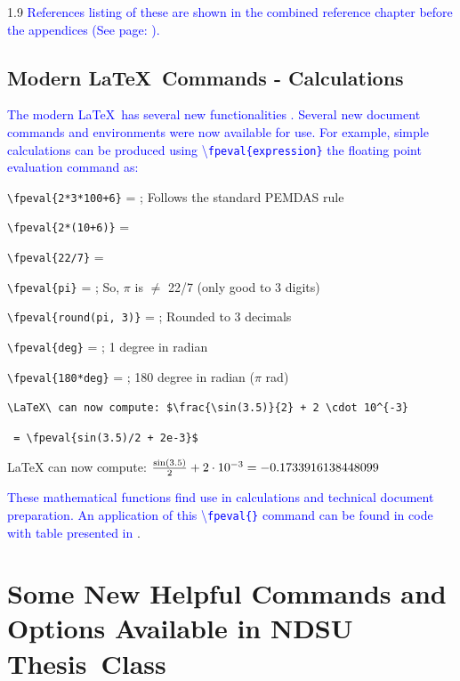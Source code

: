\documentclass[phd]{ndsu-thesis-2022}
\newcommand\myspacing{1.9} %
\newcommand\italk[1]{\textcolor{blue}{#1}}  %
\newcommand\cmd[1]{\textbackslash\texttt{#1}}  %
\newcommand\lx{\LaTeX\xspace}
\begin{document}
\begin{spacing}{\myspacing}
\italk{References listing of these are shown in the combined reference chapter before the appendices (See page: \pageref{biblio}).}

\subsection{Modern \LaTeX\ Commands - Calculations}
\italk{The modern \LaTeX\ has several new functionalities \citep{latxprojteam22}. Several new document commands and environments were now available for use.  For example, simple calculations can be produced using \cmd{fpeval\{expression\}} the floating point evaluation command as:}

\verb|\fpeval{2*3*100+6}| = ; \hspace{0.15in} Follows the standard PEMDAS rule

\verb|\fpeval{2*(10+6)}| = 
   
\verb|\fpeval{22/7}| = 

\verb|\fpeval{pi}| = ; \hspace{0.15in} So, $\pi$ is $\neq$ 22/7 (only good to 3 digits)

\verb|\fpeval{round(pi, 3)}| = ; \hspace{0.15in} Rounded to 3 decimals

\verb+\fpeval{deg}+ = ; \hspace{0.15in} 1 degree in radian

\verb+\fpeval{180*deg}+ = ; \hspace{0.15in} 180 degree in radian ($\pi$ rad)

\verb|\LaTeX\ can now compute: $\frac{\sin(3.5)}{2} + 2 \cdot 10^{-3}| 

\verb| = \fpeval{sin(3.5)/2 + 2e-3}$|

\lx can now compute: $\frac{\sin(3.5)}{2} + 2 \cdot 10^{-3} = \fpeval{sin(3.5)/2 + 2e-3}$

\italk{These mathematical functions find use in calculations and technical document preparation. An application of this \cmd{fpeval\{\}} command can be found in \Cref{tab210} code with table presented in \cpageref{tab210}}. 

\section{Some New Helpful Commands and Options Available in NDSU Thesis~Class}


\end{spacing}
\end{document}
